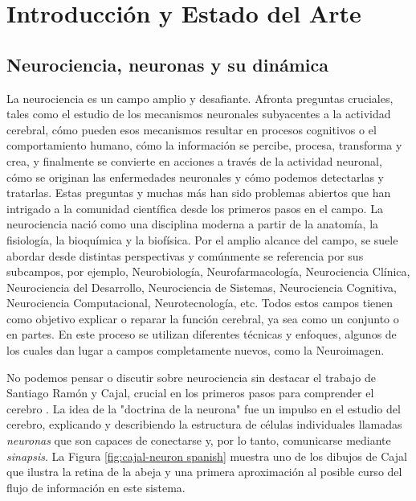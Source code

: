 \chapter{Introducción y Estado del Arte}
\label{c-intro spanish}

\section{Neurociencia, neuronas y su dinámica}
La neurociencia es un campo amplio y desafiante. Afronta preguntas cruciales, tales como el estudio de los mecanismos neuronales subyacentes a la actividad cerebral, cómo pueden esos mecanismos resultar en procesos cognitivos o el comportamiento humano, cómo la información se percibe, procesa, transforma y crea, y finalmente se convierte en acciones a través de la actividad neuronal, cómo se originan las enfermedades neuronales y cómo podemos detectarlas y tratarlas. 
Estas preguntas y muchas más han sido problemas abiertos que han intrigado a la comunidad científica desde los primeros pasos en el campo. La neurociencia nació como una disciplina moderna a partir de la anatomía, la fisiología, la bioquímica y la biofísica. Por el amplio alcance del campo, se suele abordar desde distintas perspectivas y comúnmente se referencia por sus subcampos, por ejemplo, Neurobiología, Neurofarmacología, Neurociencia Clínica, Neurociencia del Desarrollo, Neurociencia de Sistemas, Neurociencia Cognitiva, Neurociencia Computacional, Neurotecnología, etc. Todos estos campos tienen como objetivo explicar o reparar la función cerebral, ya sea como un conjunto o en partes. En este proceso se utilizan diferentes técnicas y enfoques, algunos de los cuales dan lugar a campos completamente nuevos, como la Neuroimagen.

No podemos pensar o discutir sobre neurociencia sin destacar el trabajo de Santiago Ramón y Cajal, crucial en los primeros pasos para comprender el cerebro \parencite{ramonycajal_textura_1899,decarlos_historical_2007,decastro_editorial_2016,delgado-garcia_cajal_2015,decastro_cajal_2019}. La idea de la "doctrina de la neurona" fue un impulso en el estudio del cerebro, explicando y describiendo la estructura de células individuales llamadas \textit{neuronas} que son capaces de conectarse y, por lo tanto, comunicarse mediante \textit{sinapsis}. La Figura \ref{fig:cajal-neuron spanish} muestra uno de los dibujos de Cajal que ilustra la retina de la abeja y una primera aproximación al posible curso del flujo de información en este sistema.

